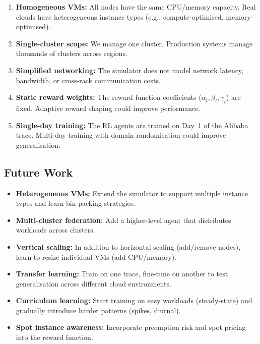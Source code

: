 \documentclass[11pt,a4paper]{article}
\begin{document}
\begin{enumerate}[leftmargin=2em]
  \item \textbf{Homogeneous VMs:} All nodes have the same CPU/memory capacity.
        Real clouds have heterogeneous instance types (e.g., compute-optimised,
        memory-optimised).
  \item \textbf{Single-cluster scope:} We manage one cluster. Production
        systems manage thousands of clusters across regions.
  \item \textbf{Simplified networking:} The simulator does not model network
        latency, bandwidth, or cross-rack communication costs.
  \item \textbf{Static reward weights:} The reward function coefficients
        ($\alpha_i, \beta_i, \gamma_i$) are fixed. Adaptive reward shaping
        could improve performance.
  \item \textbf{Single-day training:} The RL agents are trained on Day~1 of
        the Alibaba trace. Multi-day training with domain randomisation could
        improve generalisation.
\end{enumerate}

\subsection{Future Work}

\begin{itemize}[leftmargin=2em]
  \item \textbf{Heterogeneous VMs:} Extend the simulator to support multiple
        instance types and learn bin-packing strategies.
  \item \textbf{Multi-cluster federation:} Add a higher-level agent that
        distributes workloads across clusters.
  \item \textbf{Vertical scaling:} In addition to horizontal scaling (add/remove
        nodes), learn to resize individual VMs (add CPU/memory).
  \item \textbf{Transfer learning:} Train on one trace, fine-tune on another to
        test generalisation across different cloud environments.
  \item \textbf{Curriculum learning:} Start training on easy workloads
        (steady-state) and gradually introduce harder patterns (spikes, diurnal).
  \item \textbf{Spot instance awareness:} Incorporate preemption risk and
        spot pricing into the reward function.
\end{itemize}
\end{document}
